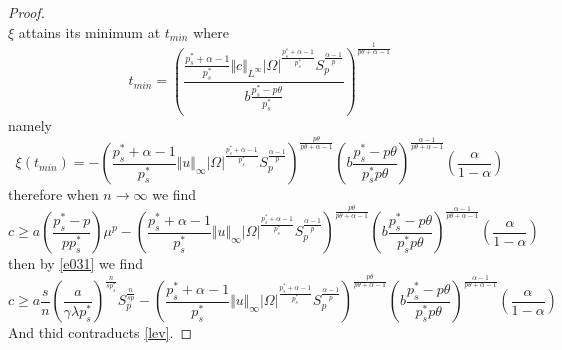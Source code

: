 \documentclass[10pt,twoside,reqno,centertags,draft]{amsart}
\begin{document}
\begin{proof}
\begin{equation*}
\end{equation*}
$ \xi$ attains its minimum at $ t_{min}$ where
\begin{equation*}
t_{min} =\left( \frac{\frac{p_s^* +\alpha -1}{p_s^*}\Vert c \Vert_{L^{\infty}}\vert \Omega\vert^{\frac{p_s^* +\alpha -1}{p_s^*}}S_{p}^{\frac{\alpha-1}{p}}}{b\frac{p_s^* -p\theta}{p_s^*}}\right)^{\frac{1}{p\theta +\alpha -1}}
\end{equation*}
namely
{\footnotesize
\begin{equation*}
\xi(t_{min}) =-\left(\frac{p_s^* +\alpha -1}{p_s^*}\Vert u\Vert_{\infty}\vert \Omega\vert^{\frac{p_s^* +\alpha -1}{p_s^*}}S_{p}^{\frac{\alpha -1}{p}}\right)^{\frac{p\theta}{p\theta +\alpha -1}}\left( b\frac{p_s^* -p\theta}{p_s^*p\theta}\right)^{\frac{\alpha -1}{p\theta +\alpha -1}}\left( \frac{\alpha}{1 -\alpha}\right)
\end{equation*}
}
therefore when $ n \to \infty$ we find
{\footnotesize
\begin{equation*}
c \geq a\left(\frac{p_s^* -p}{pp_s^*}\right)\mu^{p} -\left(\frac{p_s^* +\alpha -1}{p_s^*}\Vert u\Vert_{\infty}\vert \Omega\vert^{\frac{p_s^* +\alpha -1}{p_s^*}}S_{p}^{\frac{\alpha -1}{p}}\right)^{\frac{p\theta}{p\theta +\alpha -1}}\left( b\frac{p_s^* -p\theta}{p_s^*p\theta}\right)^{\frac{\alpha -1}{p\theta +\alpha -1}}\left( \frac{\alpha}{1 -\alpha}\right)
\end{equation*}
}
then by \ref{e031} we find
{\tiny
\begin{equation*}
c \geq a\frac{s}{n}\left(\frac{a}{\gamma \lambda p_s^*}\right)^{\frac{n}{s p_s^*}}S_{p}^{\frac{n}{s p}} -\left(\frac{p_s^* +\alpha -1}{p_s^*}\Vert u\Vert_{\infty}\vert \Omega\vert^{\frac{p_s^* +\alpha -1}{p_s^*}}S_{p}^{\frac{\alpha -1}{p}}\right)^{\frac{p\theta}{p\theta +\alpha -1}}\left( b\frac{p_s^* -p\theta}{p_s^*p\theta}\right)^{\frac{\alpha -1}{p\theta +\alpha -1}}\left( \frac{\alpha}{1 -\alpha}\right)
\end{equation*}
}
And thid contraducts \ref{lev}.
\end{proof}
\end{document}

